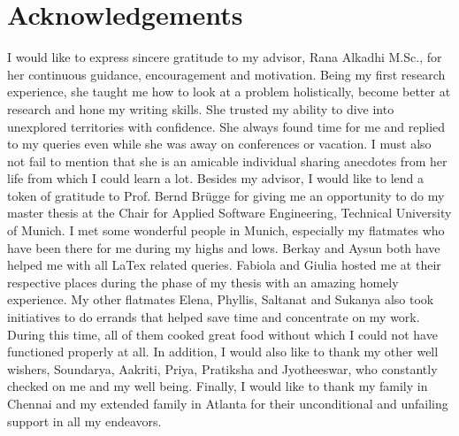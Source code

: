 \documentclass[a4paper,12pt,twoside]{report}
\begin{document}
\setlength{\evensidemargin}{22pt}
\setlength{\oddsidemargin}{22pt}


\def\doctype{Master's Thesis}
\def\faculty{Informatik}
\def\title{Mining Rationale from Issue Tracking Systems}		%
\def\titleGer{Rekonstruktion von Begr{\"u}ndungsmodellen aus Aufgabenverwaltungssystemen}	%
\def\supervisor{Prof. Bernd Brügge, Ph.D.}
\def\advisor{Rana Alkadhi, M.Sc.}
\def\author{Ankur Sinha}			%
\def\date{20.02.2018}		%



\lstset{showspaces=false, numbers=left, frame=single, basicstyle=\small}




\newpage
\thispagestyle{empty}
\mbox{}


\newpage
\thispagestyle{empty}
\mbox{}

\chapter*{Acknowledgements}
I would like to express sincere gratitude to my advisor, Rana Alkadhi M.Sc., for her continuous guidance, encouragement and motivation. Being my first research experience, she taught me how to look at a problem holistically, become better at research and hone my writing skills. She trusted my ability to dive into unexplored territories with confidence. She always found time for me and replied to my queries even while she was away on conferences or vacation. I must also not fail to mention that she is an amicable individual sharing anecdotes from her life from which I could learn a lot.
\newline \newline
Besides my advisor, I would like to lend a token of gratitude to Prof. Bernd Brügge for giving me an opportunity to do my master thesis at the Chair for Applied Software Engineering, Technical University of Munich. 
\newline \newline
I met some wonderful people in Munich, especially my flatmates who have been there for me during my highs and lows. Berkay and Aysun both have helped me with all LaTex related queries. Fabiola and Giulia hosted me at their respective places during the phase of my thesis with an amazing homely experience. My other flatmates Elena, Phyllis, Saltanat and Sukanya also took initiatives to do errands that helped save time and concentrate on my work. During this time, all of them cooked great food without which I could not have functioned properly at all. In addition, I would also like to thank my other well wishers, Soundarya, Aakriti, Priya, Pratiksha and Jyotheeswar, who constantly checked on me and my well being.
\newline \newline
Finally, I would like to thank my family in Chennai and my extended family in Atlanta for their unconditional and unfailing support in all my endeavors. 
\end{document}
